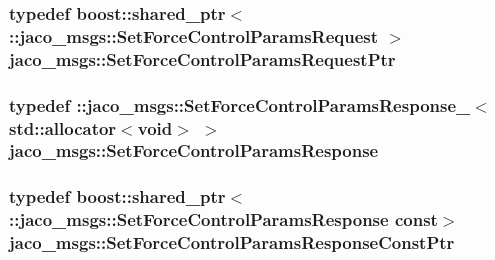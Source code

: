 \subsubsection[{\texorpdfstring{Set\+Force\+Control\+Params\+Request\+Ptr}{SetForceControlParamsRequestPtr}}]{\setlength{\rightskip}{0pt plus 5cm}typedef boost\+::shared\+\_\+ptr$<$ \+::{\bf jaco\+\_\+msgs\+::\+Set\+Force\+Control\+Params\+Request} $>$ {\bf jaco\+\_\+msgs\+::\+Set\+Force\+Control\+Params\+Request\+Ptr}}\hypertarget{namespacejaco__msgs_a8d8788dbe785e356791b6f3d2169b867}{}\label{namespacejaco__msgs_a8d8788dbe785e356791b6f3d2169b867}
\subsubsection[{\texorpdfstring{Set\+Force\+Control\+Params\+Response}{SetForceControlParamsResponse}}]{\setlength{\rightskip}{0pt plus 5cm}typedef \+::{\bf jaco\+\_\+msgs\+::\+Set\+Force\+Control\+Params\+Response\+\_\+}$<$std\+::allocator$<$void$>$ $>$ {\bf jaco\+\_\+msgs\+::\+Set\+Force\+Control\+Params\+Response}}\hypertarget{namespacejaco__msgs_afebda443b838c4657280c3c24ba107ba}{}\label{namespacejaco__msgs_afebda443b838c4657280c3c24ba107ba}
\subsubsection[{\texorpdfstring{Set\+Force\+Control\+Params\+Response\+Const\+Ptr}{SetForceControlParamsResponseConstPtr}}]{\setlength{\rightskip}{0pt plus 5cm}typedef boost\+::shared\+\_\+ptr$<$ \+::{\bf jaco\+\_\+msgs\+::\+Set\+Force\+Control\+Params\+Response} const$>$ {\bf jaco\+\_\+msgs\+::\+Set\+Force\+Control\+Params\+Response\+Const\+Ptr}}\hypertarget{namespacejaco__msgs_ac7f6242b4706d62afb32118f3bc8f7f8}{}\label{namespacejaco__msgs_ac7f6242b4706d62afb32118f3bc8f7f8}
